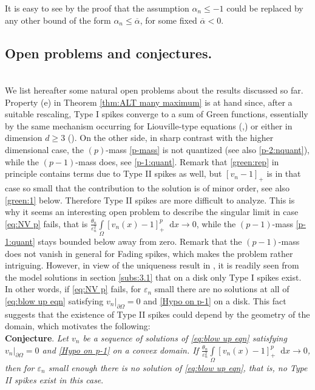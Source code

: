 \documentclass[10pt]{amsart}
\newcommand{\dd}{\mathop{}\!\mathrm{d}}
\newcommand{\eps}{\varepsilon}
\renewcommand{\to}{\rightarrow}
\newcommand{\pa}{\partial}
\newcommand{\ov}[1]{\overline{#1}}
\newcommand{\al}{\alpha}
\newcommand{\om}{\Omega}
\begin{document}
It is easy to see by the proof that the assumption $\al_n\leq -1$ could be replaced by any other bound of the form $\al_n\leq \ov{\al}$, for some
fixed $\ov{\al}<0$.

\medskip

\subsection{Open problems and conjectures.}$\,$\\
We list hereafter some natural open problems about the results discussed so far.\\

Property (e) in Theorem \ref{thm:ALT many maximum} is at hand since, after a suitable rescaling, Type I spikes converge to a sum of Green functions,
essentially by the same mechanism occurring for Liouville-type equations (\cite{yy},\cite{MaW}) or either in dimension $d\geq 3$ (\cite{BJW}).
On the other side, in sharp contrast with the higher dimensional case, the $(p)$-mass \eqref{p-mass} is not
quantized (see also \eqref{p-2:nquant}), while the $(p-1)$-mass does, see \eqref{p-1:quant}.
Remark that \eqref{green:rep} in principle contains terms due to Type II spikes as well, but
$[v_n-1]_+$ is in that case so small that the contribution to the solution is of minor order, see also \eqref{green:1} below.
Therefore Type II spikes are more difficult to analyze.
This is why it seems an interesting open problem to describe the singular limit in case \ref{eq:NV p} fails,
that is $\frac{\theta_n}{\eps_n^2}\int\limits_{\Omega} [v_n(x)-1]_+^p\dd{x}\to 0$, while the $(p-1)$-mass
\eqref{p-1:quant} stays bounded below away from zero.
Remark that the $(p-1)$-mass does not vanish in general for Fading spikes, which makes the problem rather intriguing.
However, in view of the uniqueness result in \cite{BSp}, it is readily seen from the model solutions in section \ref{subs:3.1} that on a disk only
Type I spikes exist. In other words, if \ref{eq:NV p} fails, for $\eps_n$ small there are no solutions at all of
\eqref{eq:blow up eqn} satisfying $v_n|_{\pa\om}=0$ and \eqref{Hypo on p-1} on a disk. This fact suggests that the existence of
Type II spikes could depend by the geometry of the domain, which motivates the following:\\

{\bf Conjecture}. {\it Let $v_n$ be a sequence of solutions of \eqref{eq:blow up eqn} satisfying $v_n|_{\pa\om}=0$ and \eqref{Hypo on p-1}
on a convex domain. If $\frac{\theta_n}{\eps_n^2}\int\limits_{\Omega} [v_n(x)-1]_+^p\dd{x}\to 0$, then for $\eps_n$ small enough there is no
solution of \eqref{eq:blow up eqn}, that is, no Type II spikes exist in this case}.\\
\end{document}
